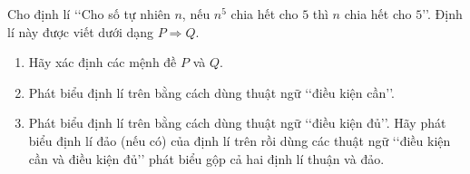 \begin{bt}
	Cho định lí \lq\lq  Cho số tự nhiên $n$, nếu $n^5$ chia hết cho $5$ thì $n$ chia hết cho $5$\rq\rq. Định lí này được viết dưới dạng $P\Rightarrow Q$.
	\begin{enumerate}
		\item Hãy xác định các mệnh đề $P$ và $Q$.
		\item Phát biểu định lí trên bằng cách dùng thuật ngữ \lq\lq  điều kiện cần\rq\rq.
		\item Phát biểu định lí trên bằng cách dùng thuật ngữ \lq\lq  điều kiện đủ\rq\rq.
		Hãy phát biểu định lí đảo (nếu có) của định lí trên rồi dùng các thuật ngữ \lq\lq  điều kiện cần và điều kiện đủ\rq\rq\text{} phát biểu gộp cả hai định lí thuận và đảo.
	\end{enumerate}
\end{bt}


